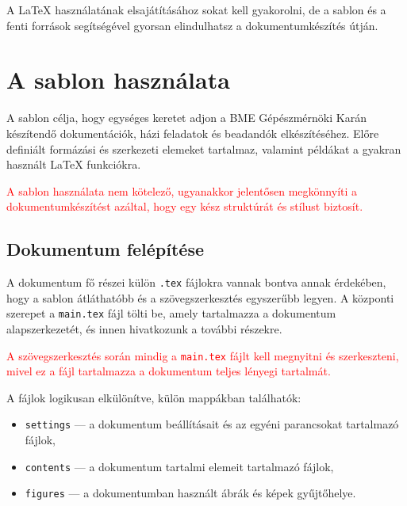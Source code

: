 \documentclass[fleqn,12pt]{article}
\begin{document}
        A \LaTeX{} használatának elsajátításához sokat kell gyakorolni, de a sablon és a fenti források segítségével gyorsan elindulhatsz a dokumentumkészítés útján. 


\section{A sablon használata}

   A sablon célja, hogy egységes keretet adjon a BME Gépészmérnöki Karán készítendő dokumentációk, házi feladatok és beadandók elkészítéséhez. Előre definiált formázási és szerkezeti elemeket tartalmaz, valamint példákat a gyakran használt \LaTeX{} funkciókra. 

    \vspace{0.5em}
    \textcolor{red}{A sablon használata nem kötelező, ugyanakkor jelentősen megkönnyíti a dokumentumkészítést azáltal, hogy egy kész struktúrát és stílust biztosít.}

    \subsection{Dokumentum felépítése}

        A dokumentum fő részei külön \texttt{.tex} fájlokra vannak bontva annak érdekében, hogy a sablon átláthatóbb és a szövegszerkesztés egyszerűbb legyen.  A központi szerepet a \texttt{main.tex} fájl tölti be, amely tartalmazza a dokumentum alapszerkezetét, és innen hivatkozunk a további részekre. 

        \vspace{0.5em}
        \textcolor{red}{A szövegszerkesztés során mindig a \texttt{main.tex} fájlt kell megnyitni és szerkeszteni, mivel ez a fájl tartalmazza a dokumentum teljes lényegi tartalmát.}
        
        \vspace{1em}
        A fájlok logikusan elkülönítve, külön mappákban találhatók:
        \begin{itemize}
            \item \texttt{settings} — a dokumentum beállításait és az egyéni parancsokat tartalmazó fájlok,
            \item \texttt{contents} — a dokumentum tartalmi elemeit tartalmazó fájlok,
            \item \texttt{figures} — a dokumentumban használt ábrák és képek gyűjtőhelye.
        \end{itemize}
\end{document}
